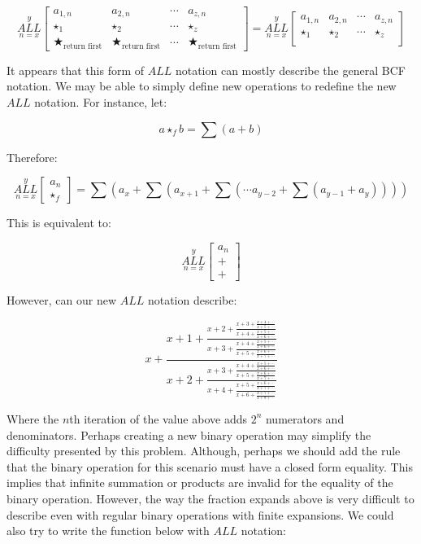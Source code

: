 \documentclass{article}
\begin{document}
$$\underset{n=x}{\overset{y}{ALL}}
\begin{bmatrix}
a_{1,n} & a_{2,n} & \cdots & a_{z,n} \\
\star_1 & \star_2 & \cdots & \star_z \\ \bigstar_{\text{return first}} & \bigstar_{\text{return first}} & \cdots & \bigstar_{\text{return first}}
\end{bmatrix}=\underset{n=x}{\overset{y}{ALL}}
\begin{bmatrix}
a_{1,n} & a_{2,n} & \cdots & a_{z,n} \\
\star_1 & \star_2 & \cdots & \star_z \\
\end{bmatrix}$$

It appears that this form of $ALL$ notation can mostly describe the general BCF notation. We may be able to simply define new operations to redefine the new $ALL$ notation. For instance, let:

$$a \star_f b = \sum (a+b)$$

Therefore:

$$\underset{n=x}{\overset{y}{ALL}}
\begin{bmatrix}
a_n \\ \star_f \end{bmatrix} = \sum (a_x+\sum(a_{x+1}+\sum(\cdots a_{y-2} + \sum(a_{y-1} +a_y))))$$

This is equivalent to:

$$\underset{n=x}{\overset{y}{ALL}}
\begin{bmatrix}
a_n \\ + \\ + \end{bmatrix}$$

However, can our new $ALL$ notation describe:

$$x+\frac{x+1+\frac{x+2+\frac{x+3+\frac{x+4+\cdots}{x+5+\cdots}}{x+4+\frac{x+5+\cdots}{x+6+\cdots}}}{x+3+\frac{x+4+\frac{x+5+\cdots}{x+6+\cdots}}{x+5+\frac{x+6+\cdots}{x+7+\cdots}}}}{x+2+\frac{x+3+\frac{x+4+\frac{x+5+\cdots}{x+6+\cdots}}{x+5+\frac{x+6+\cdots}{x+7+\cdots}}}{x+4+\frac{x+5+\frac{x+6+\cdots}{x+7+\cdots}}{x+6+\frac{x+7+\cdots}{x+8+\cdots}}}}$$

Where the $n$th iteration of the value above adds $2^n$ numerators and denominators. Perhaps creating a new binary operation may simplify the difficulty presented by this problem. Although, perhaps we should add the rule that the binary operation for this scenario must have a closed form equality. This implies that infinite summation or products are invalid for the equality of the binary operation. However, the way the fraction expands above is very difficult to describe even with regular binary operations with finite expansions. We could also try to write the function below with $ALL$ notation:
\end{document}
